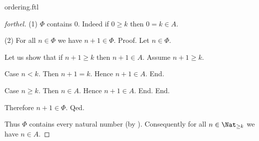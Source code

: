 \documentclass{naproche-library}
\begin{document}
\begin{smodule}{ordering.ftl}
\begin{proof}[forthel]
    (1) $\Phi$ contains $0$.
    Indeed if $0 \geq k$ then $0 = k \in A$.

    (2) For all $n \in \Phi$ we have $n + 1 \in \Phi$. \newline
    Proof.
      Let $n \in \Phi$.

      Let us show that if $n + 1 \geq k$ then $n + 1 \in A$.
        Assume $n + 1 \geq k$.

        Case $n < k$.
          Then $n + 1 = k$.
          Hence $n + 1 \in A$.
        End.

        Case $n \geq k$.
          Then $n \in A$.
          Hence $n + 1 \in A$.
        End.
      End.

      Therefore $n + 1 \in \Phi$.
    Qed.

    Thus $\Phi$ contains every natural number (by ).
    Consequently for all $n \in \Nat_{\geq k}$ we have $n \in A$.
  \end{proof}
\end{smodule}
\end{document}
